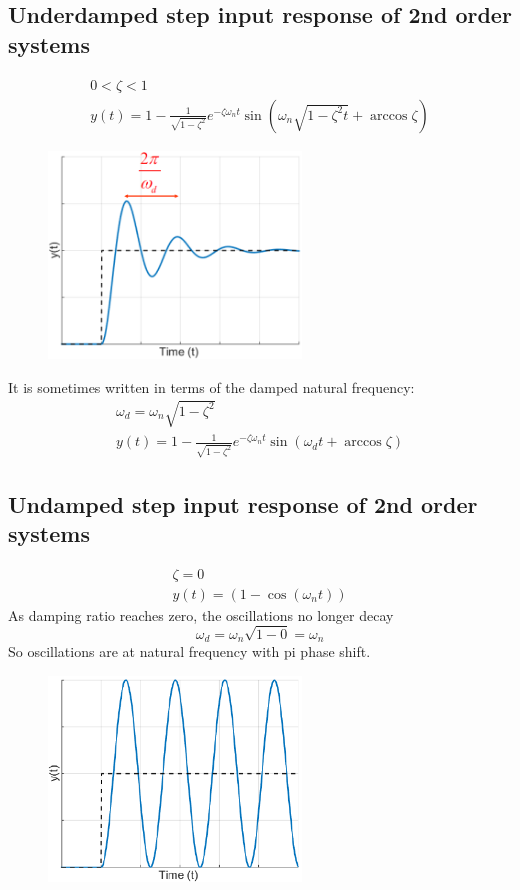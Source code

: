 \documentclass[class=report, crop=false, 12pt,a4paper]{standalone}
\begin{document}
\subsection{Underdamped step input response of 2nd order systems}
\begin{gather}
  0 < \zeta < 1 \\
  y(t) = 1 - \frac{1}{\sqrt{1 - \zeta^2}}e^{-\zeta \omega_n t} \sin{\left(\omega_n \sqrt{1-\zeta^2 t} + \arccos{\zeta}\right)}
\end{gather}
\begin{figure}[H]
  \centering
  \includegraphics[width = 0.6\textwidth]{../img/diagram74.png}
\end{figure}
It is sometimes written in terms of the damped natural frequency:
\begin{gather}
  \omega_d = \omega_n \sqrt{1-\zeta^2}\\
  y(t) = 1 - \frac{1}{\sqrt{1-\zeta^2}} e^{-\zeta \omega_n t} \sin{\left(\omega_d t + \arccos{\zeta}\right)}
\end{gather}
\subsection{Undamped step input response of 2nd order systems}
\begin{align}
  \zeta = 0 \\
  y(t) = \left(1 - \cos{(\omega_n t)}\right)
\end{align}
As damping ratio reaches zero, the oscillations no longer decay
\begin{equation}
  \omega_d = \omega_n \sqrt{1 - 0} = \omega_n
\end{equation}
So oscillations are at natural frequency with pi phase shift.
\begin{figure}[H]
  \centering
  \includegraphics[width = 0.6\textwidth]{../img/diagram75.png}
\end{figure}
\end{document}
